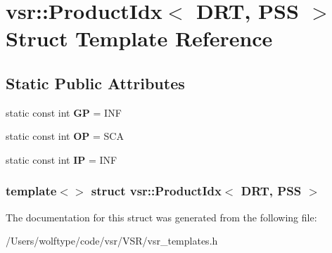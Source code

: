 \hypertarget{structvsr_1_1_product_idx_3_01_d_r_t_00_01_p_s_s_01_4}{\section{vsr\-:\-:Product\-Idx$<$ D\-R\-T, P\-S\-S $>$ Struct Template Reference}
\label{structvsr_1_1_product_idx_3_01_d_r_t_00_01_p_s_s_01_4}
}
\subsection*{Static Public Attributes}
\begin{DoxyCompactItemize}
\item 
\hypertarget{structvsr_1_1_product_idx_3_01_d_r_t_00_01_p_s_s_01_4_a2063ef80ae03f5a1c0dd8d43066b7212}{static const int {\bfseries G\-P} = I\-N\-F}\label{structvsr_1_1_product_idx_3_01_d_r_t_00_01_p_s_s_01_4_a2063ef80ae03f5a1c0dd8d43066b7212}

\item 
\hypertarget{structvsr_1_1_product_idx_3_01_d_r_t_00_01_p_s_s_01_4_a527477524f46dda689c71877519261e4}{static const int {\bfseries O\-P} = S\-C\-A}\label{structvsr_1_1_product_idx_3_01_d_r_t_00_01_p_s_s_01_4_a527477524f46dda689c71877519261e4}

\item 
\hypertarget{structvsr_1_1_product_idx_3_01_d_r_t_00_01_p_s_s_01_4_afcd472fadc21965b388e323ac49bfc3d}{static const int {\bfseries I\-P} = I\-N\-F}\label{structvsr_1_1_product_idx_3_01_d_r_t_00_01_p_s_s_01_4_afcd472fadc21965b388e323ac49bfc3d}

\end{DoxyCompactItemize}
\subsubsection*{template$<$$>$ struct vsr\-::\-Product\-Idx$<$ D\-R\-T, P\-S\-S $>$}



The documentation for this struct was generated from the following file\-:\begin{DoxyCompactItemize}
\item 
/\-Users/wolftype/code/vsr/\-V\-S\-R/vsr\-\_\-templates.\-h\end{DoxyCompactItemize}
